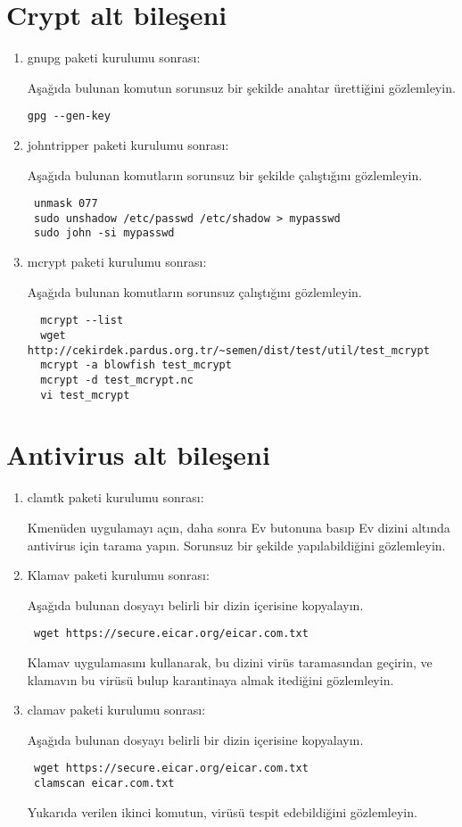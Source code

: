 \documentclass[a4paper,10pt]{article}
\begin{document}
\section{Crypt alt bileşeni}
\begin{enumerate}
\item gnupg paketi kurulumu sonrası:

Aşağıda bulunan komutun sorunsuz bir şekilde anahtar ürettiğini gözlemleyin.
\begin{verbatim}
gpg --gen-key
\end{verbatim}

\item johntripper paketi kurulumu sonrası:

Aşağıda bulunan komutların sorunsuz bir şekilde çalıştığını gözlemleyin.
\begin{verbatim}
 unmask 077
 sudo unshadow /etc/passwd /etc/shadow > mypasswd
 sudo john -si mypasswd 
\end{verbatim}

 \item mcrypt paketi kurulumu sonrası:

Aşağıda bulunan komutların sorunsuz çalıştığını gözlemleyin.
\begin{verbatim}
  mcrypt --list
  wget http://cekirdek.pardus.org.tr/~semen/dist/test/util/test_mcrypt
  mcrypt -a blowfish test_mcrypt
  mcrypt -d test_mcrypt.nc
  vi test_mcrypt
\end{verbatim}


\end{enumerate}


\section{Antivirus alt bileşeni}
\begin{enumerate}
\item clamtk paketi kurulumu sonrası:

Kmenüden uygulamayı açın, daha sonra Ev butonuna basıp Ev dizini altında antivirus için tarama yapın.
Sorunsuz bir şekilde yapılabildiğini gözlemleyin.

\item Klamav paketi kurulumu sonrası:

Aşağıda bulunan dosyayı belirli bir dizin içerisine kopyalayın. 
\begin{verbatim}
 wget https://secure.eicar.org/eicar.com.txt
\end{verbatim}

Klamav uygulamasını kullanarak, bu dizini virüs taramasından geçirin, ve klamavın bu virüsü bulup karantinaya almak itediğini gözlemleyin.

\item clamav paketi kurulumu sonrası:

Aşağıda bulunan dosyayı belirli bir dizin içerisine kopyalayın. 
\begin{verbatim}
 wget https://secure.eicar.org/eicar.com.txt
 clamscan eicar.com.txt
\end{verbatim}

Yukarıda verilen ikinci komutun, virüsü tespit edebildiğini gözlemleyin.

\end{enumerate}
\end{document}
